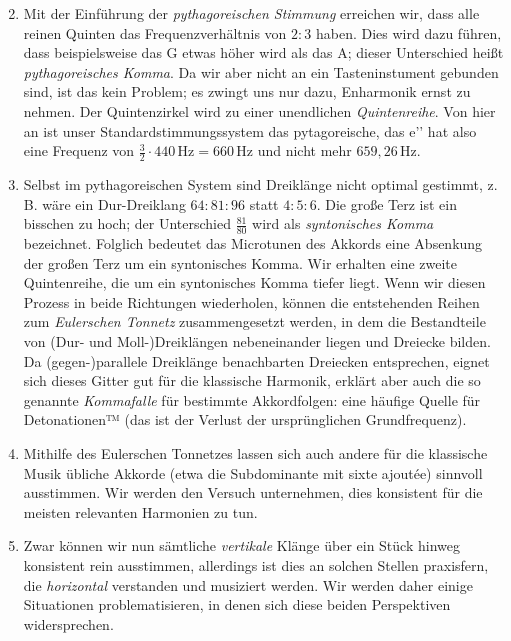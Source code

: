 \begin{enumerate}
  \setcounter{enumi}{1}
\item Mit der Einführung der \emph{pythagoreischen Stimmung} erreichen wir,
  dass alle reinen Quinten das Frequenzverhältnis von $2:3$ haben. Dies wird
  dazu führen, dass beispielsweise das \sharp G etwas höher wird als das
  \flat A; dieser Unterschied heißt \emph{pythagoreisches Komma}. Da wir aber 
  nicht an ein Tasteninstument 
  gebunden sind, ist das kein Problem; es zwingt uns nur dazu, Enharmonik ernst
  zu nehmen. Der Quintenzirkel wird zu einer unendlichen \emph{Quintenreihe}.
  Von hier an ist unser Standardstimmungssystem das pytagoreische, das e’’ hat
  also eine Frequenz von $\frac32\cdot 440\,\text{Hz}=660\,\text{Hz}$ und nicht
  mehr $659{,}26\,\text{Hz}$.
\item Selbst im pythagoreischen System sind Dreiklänge nicht optimal gestimmt,
  z.\,B. wäre ein Dur-Dreiklang $64:81:96$ statt $4:5:6$. Die große Terz ist ein
  bisschen zu hoch; der Unterschied $\frac{81}{80}$ wird als \emph{syntonisches
  Komma} bezeichnet. Folglich bedeutet das Microtunen des Akkords eine
  Absenkung der großen Terz um ein syntonisches Komma. Wir erhalten eine zweite
  Quintenreihe, die um ein syntonisches Komma tiefer liegt. Wenn wir diesen
  Prozess in beide Richtungen wiederholen, können die entstehenden Reihen zum
  \emph{Eulerschen Tonnetz} zusammengesetzt werden, in dem die Bestandteile von (Dur-
  und Moll-)Dreiklängen nebeneinander liegen und Dreiecke bilden. Da
  \mbox{(gegen-)}parallele Dreiklänge benachbarten Dreiecken entsprechen, eignet sich
  dieses Gitter gut für die klassische Harmonik, erklärt aber auch die so
  genannte \emph{Kommafalle} für bestimmte Akkordfolgen: eine häufige Quelle
  für Detonationen™ (das ist der Verlust der ursprünglichen Grundfrequenz).
\item Mithilfe des Eulerschen Tonnetzes lassen sich auch andere für die
  klassische Musik übliche Akkorde (etwa die Subdominante mit sixte ajoutée)
  sinnvoll ausstimmen. Wir werden den Versuch unternehmen, dies konsistent für
  die meisten relevanten Harmonien zu tun.
\item Zwar können wir nun sämtliche \emph{vertikale} Klänge über ein Stück
  hinweg konsistent rein ausstimmen, allerdings ist dies an solchen
  Stellen praxisfern, die \emph{horizontal} verstanden und musiziert werden. Wir
  werden daher einige Situationen problematisieren, in denen sich diese beiden
  Perspektiven widersprechen.

\end{enumerate}
